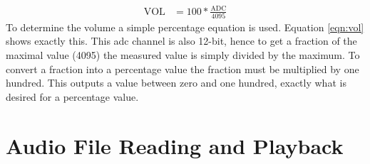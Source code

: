 \documentclass[12pt,a4paper]{report}
\begin{document}
\begin{equation}
	\label{eqn:vol}
\begin{aligned}
\text{VOL} &= 100*\frac{\text{ADC}}{4095}
\end{aligned}
\end{equation}
To determine the volume a simple percentage equation is used. Equation \ref{eqn:vol} shows exactly this. This \ac{adc} channel is also 12-bit, hence to get a fraction of the maximal value (4095) the measured value is simply divided by the maximum. To convert a fraction into a percentage value the fraction must be multiplied by one hundred. This outputs a value between zero and one hundred, exactly what is desired for a percentage value.
\section{Audio File Reading and Playback} \label{sec:audioSetup}
\end{document}
